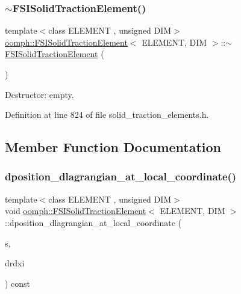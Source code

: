 \subsubsection{\texorpdfstring{$\sim$\+F\+S\+I\+Solid\+Traction\+Element()}{~FSISolidTractionElement()}}
{\footnotesize\ttfamily template$<$class E\+L\+E\+M\+E\+NT , unsigned D\+IM$>$ \\
\hyperlink{classoomph_1_1FSISolidTractionElement}{oomph\+::\+F\+S\+I\+Solid\+Traction\+Element}$<$ E\+L\+E\+M\+E\+NT, D\+IM $>$\+::$\sim$\hyperlink{classoomph_1_1FSISolidTractionElement}{F\+S\+I\+Solid\+Traction\+Element} (\begin{DoxyParamCaption}{ }\end{DoxyParamCaption})\hspace{0.3cm}{\ttfamily [inline]}}



Destructor\+: empty. 



Definition at line 824 of file solid\+\_\+traction\+\_\+elements.\+h.



\subsection{Member Function Documentation}
\mbox{\label{classoomph_1_1FSISolidTractionElement_a65724c5eb73e1f82a0c8230e84f86144}} 
\subsubsection{\texorpdfstring{dposition\+\_\+dlagrangian\+\_\+at\+\_\+local\+\_\+coordinate()}{dposition\_dlagrangian\_at\_local\_coordinate()}}
{\footnotesize\ttfamily template$<$class E\+L\+E\+M\+E\+NT , unsigned D\+IM$>$ \\
void \hyperlink{classoomph_1_1FSISolidTractionElement}{oomph\+::\+F\+S\+I\+Solid\+Traction\+Element}$<$ E\+L\+E\+M\+E\+NT, D\+IM $>$\+::dposition\+\_\+dlagrangian\+\_\+at\+\_\+local\+\_\+coordinate (\begin{DoxyParamCaption}\item[{const \hyperlink{classoomph_1_1Vector}{Vector}$<$ double $>$ \&}]{s,  }\item[{\hyperlink{classoomph_1_1DenseMatrix}{Dense\+Matrix}$<$ double $>$ \&}]{drdxi }\end{DoxyParamCaption}) const\hspace{0.3cm}{\ttfamily [inline]}}



